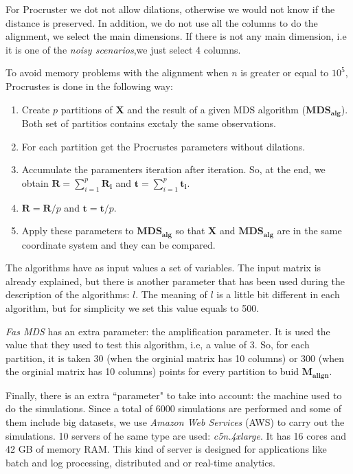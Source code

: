 \documentclass[11pt]{report}
\begin{document}
\indent For Procruster we dot not allow dilations, otherwise we would not
know if the distance is preserved. In addition, we do not use all the columns 
to do the alignment, we select the main dimensions. If there is not any
main dimension, i.e it is one of the \textit{noisy scenarios},we just select 4 
columns. 

\indent To avoid memory problems with the alignment when $n$ is greater or 
equal to $10^5$, Procrustes is done in the following way:

\begin{enumerate}

\item Create $p$ partitions of \textbf{X} and the result of a given MDS 
algorithm ($\mathbf{MDS_{alg}}$). Both set of partitios contains exctaly the
same observations.


\item For each partition get the Procrustes parameters without dilations.

\item Accumulate the paramenters iteration after iteration. So, at the end, 
we obtain $\mathbf{R} = \sum_{i = 1}^p \mathbf{R_i}$ and 
$\mathbf{t} = \sum_{i = 1}^p \mathbf{t_i}$.

\item $\mathbf{R} = \mathbf{R}/p$ and $\mathbf{t} = \mathbf{t}/p$.

\item Apply these parameters to $\mathbf{MDS_{alg}}$ so that 
\textbf{X} and $\mathbf{MDS_{alg}}$ are in the same coordinate system and
they can be compared.


\end{enumerate}

\indent The algorithms have as input values a set of variables. The input matrix 
is already explained, but there is another parameter that has been used during 
the description of the algorithms: $l$. The meaning of $l$ is a little bit 
different in each algorithm, but for simplicity we set this value
equals to 500.

\indent \textit{Fas MDS} has an extra parameter: the amplification parameter.
It is used the value that they used to test this algorithm, i.e, a value of
3. So, for each partition, it is taken 30 (when the orginial matrix
has 10 columns) or 300 (when the orginial matrix has 10 columns) points for
every partition to buid $\mathbf{M_{align}}$.

\indent Finally, there is an extra ``parameter" to take into account: the 
machine used to do the simulations. Since a total of 6000 simulations are
performed and some of them include big datasets, we use 
\textit{Amazon Web Services} (AWS) to carry out the simulations. 
10 servers of he same type are used: \textit{c5n.4xlarge}. It 
has 16 cores and 42 GB of memory RAM. This kind of server is designed for 
applications like batch and log processing, distributed and or 
real-time analytics. 
\end{document}
